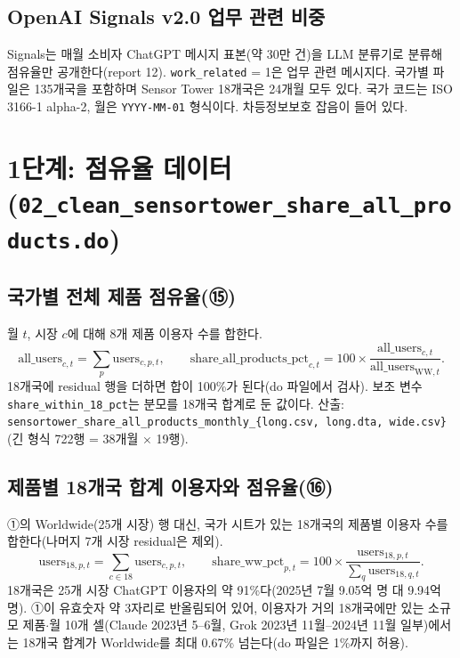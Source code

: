 \documentclass[11pt]{article}
\begin{document}
\subsection{OpenAI Signals v2.0 업무 관련 비중}
Signals는 매월 소비자 ChatGPT 메시지 표본(약 30만 건)을 LLM 분류기로 분류해 점유율만 공개한다(report 12). \texttt{work\_related} = 1은 업무 관련 메시지다. 국가별 파일은 135개국을 포함하며 Sensor Tower 18개국은 24개월 모두 있다. 국가 코드는 ISO 3166-1 alpha-2, 월은 \texttt{YYYY-MM-01} 형식이다. 차등정보보호 잡음이 들어 있다.

\section{1단계: 점유율 데이터(\texttt{02\_clean\_sensortower\_share\_all\_products.do})}

\subsection{국가별 전체 제품 점유율(⑮)}
월 $t$, 시장 $c$에 대해 8개 제품 이용자 수를 합한다.
\[
  \text{all\_users}_{c,t} = \sum_{p} \text{users}_{c,p,t}, \qquad
  \text{share\_all\_products\_pct}_{c,t} = 100 \times \frac{\text{all\_users}_{c,t}}{\text{all\_users}_{\text{WW},t}} .
\]
18개국에 residual 행을 더하면 합이 100\%가 된다(do 파일에서 검사). 보조 변수 \texttt{share\_within\_18\_pct}는 분모를 18개국 합계로 둔 값이다. 산출: \texttt{sensortower\_share\_all\_products\_monthly\_\{long.csv, long.dta, wide.csv\}}(긴 형식 722행 = 38개월 $\times$ 19행).

\subsection{제품별 18개국 합계 이용자와 점유율(⑯)}
①의 Worldwide(25개 시장) 행 대신, 국가 시트가 있는 18개국의 제품별 이용자 수를 합한다(나머지 7개 시장 residual은 제외).
\[
  \text{users}_{18,p,t} = \sum_{c \in 18} \text{users}_{c,p,t}, \qquad
  \text{share\_ww\_pct}_{p,t} = 100 \times \frac{\text{users}_{18,p,t}}{\sum_{q} \text{users}_{18,q,t}} .
\]
18개국은 25개 시장 ChatGPT 이용자의 약 91\%다(2025년 7월 9.05억 명 대 9.94억 명). ①이 유효숫자 약 3자리로 반올림되어 있어, 이용자가 거의 18개국에만 있는 소규모 제품$\cdot$월 10개 셀(Claude 2023년 5--6월, Grok 2023년 11월--2024년 11월 일부)에서는 18개국 합계가 Worldwide를 최대 0.67\% 넘는다(do 파일은 1\%까지 허용).
\end{document}
